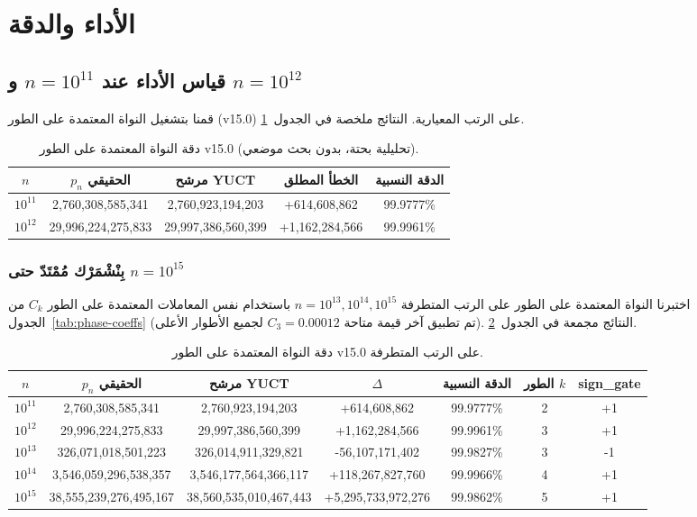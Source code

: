 \documentclass[11pt,a4paper]{article}
\begin{document}
	\section{الأداء والدقة}
	\label{sec:performance}
	\subsection{قياس الأداء عند $n=10^{11}$ و $n=10^{12}$}
	قمنا بتشغيل النواة المعتمدة على الطور (v15.0) على الرتب المعيارية. النتائج ملخصة في الجدول~\ref{tab:benchmark-v15}.
	
	\begin{table}[htbp]
		\centering
		\caption{دقة النواة المعتمدة على الطور v15.0 (تحليلية بحتة، بدون بحث موضعي).}
		\label{tab:benchmark-v15}
		\begin{tabular}{c c c c c}
			\toprule
			$n$ & $p_n$ الحقيقي & مرشح YUCT & الخطأ المطلق & الدقة النسبية \\
			\midrule
			\(10^{11}\) & 2,760,308,585,341 & 2,760,923,194,203 & +614,608,862 & 99.9777\% \\
			\(10^{12}\) & 29,996,224,275,833 & 29,997,386,560,399 & +1,162,284,566 & 99.9961\% \\
			\bottomrule
		\end{tabular}
	\end{table}
	
	\subsubsection{بِنْشْمَرْك مُمْتَدّ حتى \(n=10^{15}\)}
	
	اختبرنا النواة المعتمدة على الطور على الرتب المتطرفة
	\(n = 10^{13}, 10^{14}, 10^{15}\) باستخدام نفس المعاملات المعتمدة على الطور
	\(C_k\) من الجدول~\ref{tab:phase-coeffs} (تم تطبيق آخر قيمة متاحة
	\(C_3 = 0.00012\) لجميع الأطوار الأعلى).
	النتائج مجمعة في الجدول~\ref{tab:benchmark-extreme}.
	
	\begin{table}[htbp]
		\centering
		\caption{دقة النواة المعتمدة على الطور v15.0 على الرتب المتطرفة.}
		\label{tab:benchmark-extreme}
		\begin{tabular}{c c c c c c c}
			\toprule
			\(n\) & \(p_n\) الحقيقي & مرشح YUCT & \(\Delta\) & الدقة النسبية & الطور \(k\) & sign\_gate \\
			\midrule
			\(10^{11}\) & 2,760,308,585,341 & 2,760,923,194,203 & +614,608,862   & 99.9777\% & 2 & +1 \\
			\(10^{12}\) & 29,996,224,275,833 & 29,997,386,560,399 & +1,162,284,566 & 99.9961\% & 3 & +1 \\
			\(10^{13}\) & 326,071,018,501,223 & 326,014,911,329,821 & -56,107,171,402 & 99.9827\% & 3 & -1 \\
			\(10^{14}\) & 3,546,059,296,538,357 & 3,546,177,564,366,117 & +118,267,827,760 & 99.9966\% & 4 & +1 \\
			\(10^{15}\) & 38,555,239,276,495,167 & 38,560,535,010,467,443 & +5,295,733,972,276 & 99.9862\% & 5 & +1 \\
			\bottomrule
		\end{tabular}
	\end{table}
	
\end{document}
